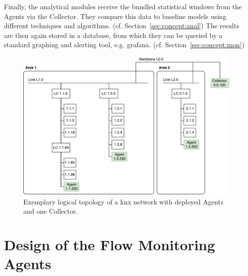 Finally, the analytical modules receive the bundled statistical windows from the Agents via the Collector. They compare this data to baseline models using different techniques and algorithms. (cf. Section~\ref{sec:concept:anal})
The results are then again stored in a database, from which they can be queried by a standard graphing and alerting tool, e.g. \gls{grafana}. (cf. Section~\ref{sec:concept:mon})

\begin{figure}
	\centering
	\includegraphics[width=\textwidth]{figures/500-knx-demo-topo-with-agents.pdf}
	\caption[KNX network topology with Agents and Collector]{Exemplary logical topology of a \gls{knx} network with deployed Agents and one Collector.}
	\label{fig:concept:network}
\end{figure}

\section{Design of the Flow Monitoring Agents}
\label{sec:concept:agent}

